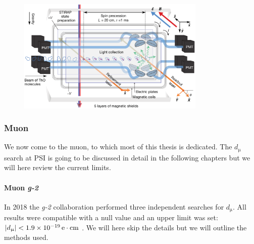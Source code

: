 \begin{refsection}
            \begin{figure}
                \centering
                \includegraphics[width = 0.8\textwidth]{Figures/Introduction/eEDM_ACME.png}
                \caption{}
                \label{fig:ACME}
            \end{figure}
        
        \subsubsection{Muon}
            We now come to the muon, to which most of this thesis is dedicated. The $d_\upmu$ search at PSI is going to be discussed in detail in the following chapters but we will here review the current limits. 
            
            \paragraph{Muon \textit{g-2}}
            In 2018 the \textit{g-2} collaboration performed three independent searches for $d_\upmu$.
            All results were compatible with a null value and an upper limit was set: $\abs{d_\upmu}<\SI{1.9e-19}{e\cdot cm}$ \cite{muEDM:direct}.  
            We will here skip the details but we will outline the methods used.\\


\end{refsection}
